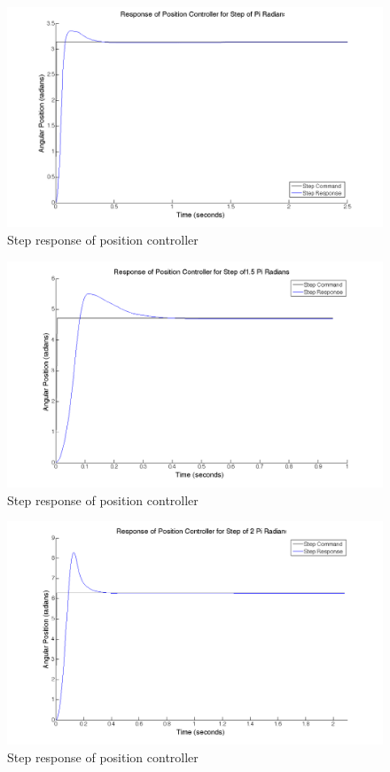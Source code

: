 \documentclass{article}
\theoremstyle{plain}
\theoremstyle{definition}
\theoremstyle{remark}
\begin{document}
\begin{figure}[htb]
\begin{center}
\includegraphics[width = 14cm]{posstep_1pi.png}
\caption{Step response of position controller}
\label{q5_b1}
\end{center}
\end{figure}

\begin{figure}[htb]
\begin{center}
\includegraphics[width = 14cm]{posstep_15pi.png}
\caption{Step response of position controller}
\label{q5_b2}
\end{center}
\end{figure}

\begin{figure}[htb]
\begin{center}
\includegraphics[width = 14cm]{posstep_2pi.png}
\caption{Step response of position controller}
\label{q5_b3}
\end{center}
\end{figure}
\end{document}
